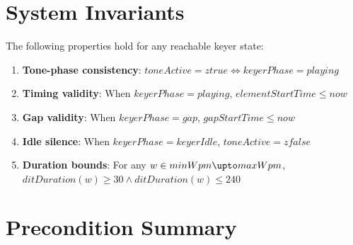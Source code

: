 \documentclass[a4paper,10pt,fleqn]{article}
\begin{document}
\section{System Invariants}

The following properties hold for any reachable keyer state:

\begin{enumerate}
\item \textbf{Tone-phase consistency}:
      $toneActive = ztrue \iff keyerPhase = playing$

\item \textbf{Timing validity}: When $keyerPhase = playing$,
      $elementStartTime \leq now$

\item \textbf{Gap validity}: When $keyerPhase = gap$,
      $gapStartTime \leq now$

\item \textbf{Idle silence}: When $keyerPhase = keyerIdle$,
      $toneActive = zfalse$

\item \textbf{Duration bounds}: For any $w \in minWpm \upto maxWpm$,
      $ditDuration(w) \geq 30 \land ditDuration(w) \leq 240$
\end{enumerate}

\section{Precondition Summary}
\end{document}
